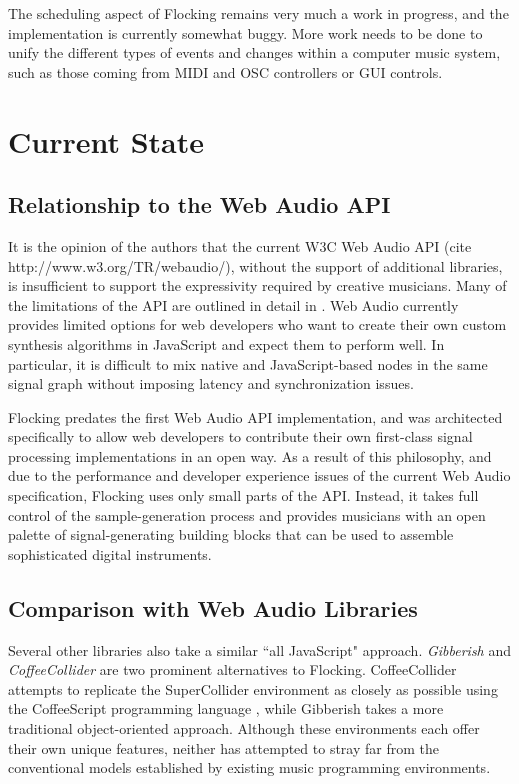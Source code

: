 \documentclass{article}
\begin{document}
The scheduling aspect of Flocking remains very much a work in progress, and the implementation is currently somewhat buggy. More work needs to be done to unify the different types of events and changes within a computer music system, such as those coming from MIDI and OSC controllers or GUI controls.

\section{Current State}

\subsection{Relationship to the Web Audio API}

It is the opinion of the authors that the current W3C Web Audio API (cite http://www.w3.org/TR/webaudio/), without the support of additional libraries, is insufficient to support the expressivity required by creative musicians. Many of the limitations of the API are outlined in detail in \cite{DBLP:journals/comj/WyseS13}. Web Audio currently provides limited options for web developers who want to create their own custom synthesis algorithms in JavaScript and expect them to perform well. In particular, it is difficult to mix native and JavaScript-based nodes in the same signal graph without imposing latency and synchronization issues.

Flocking predates the first Web Audio API implementation, and was architected specifically to allow web developers to contribute their own first-class signal processing implementations in an open way. As a result of this philosophy, and due to the performance and developer experience issues of the current Web Audio specification, Flocking uses only small parts of the API. Instead, it takes full control of the sample-generation process and provides musicians with an open palette of signal-generating building blocks that can be used to assemble sophisticated digital instruments.

\subsection{Comparison with Web Audio Libraries}

Several other libraries also take a similar ``all JavaScript" approach. {\it Gibberish} \cite{roberts_web_2013} and {\it CoffeeCollider} \cite{Mohayonao} are two prominent alternatives to Flocking. CoffeeCollider attempts to replicate the SuperCollider environment as closely as possible using the CoffeeScript programming language \cite{Ashkenas}, while Gibberish takes a more traditional object-oriented approach. Although these environments each offer their own unique features, neither has attempted to stray far from the conventional models established by existing music programming environments.
\end{document}
